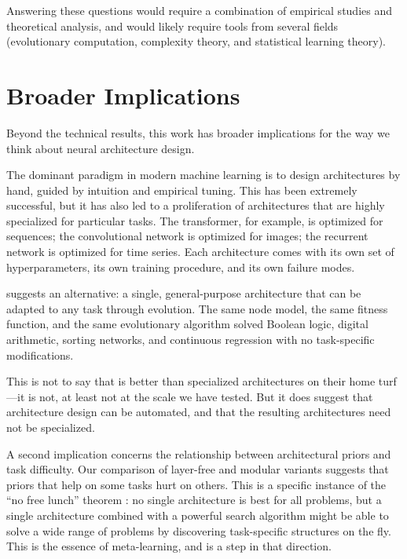 Answering these questions would require a combination of empirical
studies and theoretical analysis, and would likely require tools from
several fields (evolutionary computation, complexity theory, and
statistical learning theory).

\section{Broader Implications}
\label{sec:disc-broader}

Beyond the technical results, this work has broader implications for
the way we think about neural architecture design.

The dominant paradigm in modern machine learning is to design
architectures by hand, guided by intuition and empirical tuning. This
has been extremely successful, but it has also led to a proliferation
of architectures that are highly specialized for particular tasks. The
transformer, for example, is optimized for sequences; the convolutional
network is optimized for images; the recurrent network is optimized
for time series. Each architecture comes with its own set of
hyperparameters, its own training procedure, and its own failure modes.

\modnet{} suggests an alternative: a single, general-purpose
architecture that can be adapted to any task through evolution. The
same node model, the same fitness function, and the same evolutionary
algorithm solved Boolean logic, digital arithmetic, sorting networks,
and continuous regression with no task-specific modifications.

This is not to say that \modnet{} is better than specialized
architectures on their home turf---it is not, at least not at the scale
we have tested. But it does suggest that architecture design can be
automated, and that the resulting architectures need not be
specialized.

A second implication concerns the relationship between architectural
priors and task difficulty. Our comparison of layer-free and modular
variants suggests that priors that help on some tasks hurt on others.
This is a specific instance of the ``no free lunch'' theorem
\citep{wolpert1997no}: no single architecture is best for all problems,
but a single architecture combined with a powerful search algorithm
might be able to solve a wide range of problems by discovering
task-specific structures on the fly. This is the essence of
meta-learning, and \modnet{} is a step in that direction.

